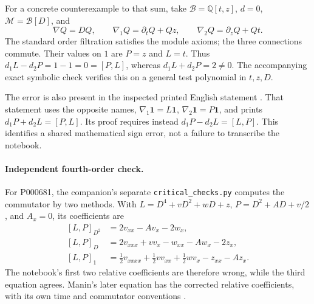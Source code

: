 For a concrete counterexample to that sum, take
\(\mathcal B=\mathbb Q[t,z]\), \(d=0\),
\(\mathcal M=\mathcal B[D]\), and
\[
 \nabla Q=DQ,\qquad
 \nabla_1Q=\partial_tQ+Qz,\qquad
 \nabla_2Q=\partial_zQ+Qt.
\]
The standard order filtration satisfies the module axioms; the three
connections commute. Their values on \(1\) are \(P=z\) and \(L=t\).
Thus \(d_1L-d_2P=1-1=0=[P,L]\), whereas
\(d_1L+d_2P=2\ne0\). The accompanying exact symbolic check verifies this
on a general test polynomial in \(t,z,D\).

The error is also present in the inspected printed English statement
\citep[Chapter~III, Theorem~2.6, p.~83]{manin1978algebraic}.
That statement uses the opposite names,
\(\nabla_1\mathbf1=L\mathbf1\), \(\nabla_2\mathbf1=P\mathbf1\),
and prints \(d_1P+d_2L=[P,L]\). Its proof requires instead
\(d_1P-d_2L=[L,P]\). This identifies a shared mathematical sign error,
not a failure to transcribe the notebook.

\paragraph{Independent fourth-order check.}\oursComputed{}
For P000681, the companion's separate \texttt{critical\_checks.py} computes
the commutator by two methods. With \(L=D^4+vD^2+wD+z\),
\(P=D^2+AD+v/2\), and \(A_x=0\), its coefficients are
\[
\begin{aligned}
[L,P]_{D^2}&=2v_{xx}-Av_x-2w_x,\\
[L,P]_{D}&=2v_{xxx}+vv_x-w_{xx}-Aw_x-2z_x,\\
[L,P]_{1}&=\tfrac12v_{xxxx}+\tfrac12vv_{xx}+\tfrac12wv_x-z_{xx}-Az_x.
\end{aligned}
\]
The notebook's first two relative coefficients are therefore wrong, while
the third equation agrees. Manin's later equation has the corrected relative
coefficients, with its own time and commutator conventions
\citep[Chapter~III, \S6.3, equation~(17), p.~96]{manin1978algebraic}.
